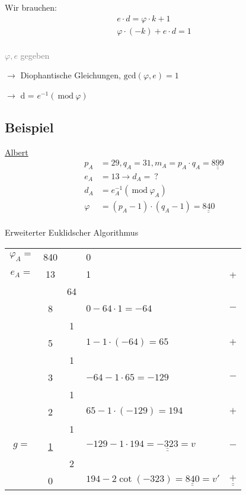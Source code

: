 \documentclass[a4paper, ngerman, landscape, fleqn]{article}
\newcommand{\Mod}{\ \mathrm{mod}\ }
\begin{document}
\begin{multicols*}{3}
Wir brauchen:
\begin{align*}
    e \cdot d = \varphi \cdot k + 1 \\
    \varphi \cdot (-k) + e \cdot d = 1 \\
\end{align*}

\textcolor{gray}{$\varphi, e$ gegeben}

$\rightarrow$ Diophantische Gleichungen, $\mathrm{gcd}(\varphi, e) = 1$

$\rightarrow$ d = $e^{-1} (\Mod \varphi)$

\subsection*{Beispiel}
\underline{Albert}
\begin{align*}
    p_A &= 29, q_A = 31, m_A = p_A \cdot q_A = \underline{\underline{899}} \\
    e_A &= 13 \rightarrow d_A =\ ? \\
    d_A &= e^{-1}_A (\Mod \varphi_A) \\
    \varphi &= (p_A - 1) \cdot (q_A - 1) = \underline{\underline{840}} \\
\end{align*}

Erweiterter Euklidscher Algorithmus

\begin{tabularx}{\linewidth}{cccYc}
    $\varphi_A =$ & 840 &    & 0 &   \\
    $e_A =$       &  13 &    & 1 & + \\
                  &     & 64 &   &   \\
                  &   8 &    & $0 -64 \cdot 1 = -64$ & $-$  \\
                  &     &  1 &   &   \\
                  &   5 &    & $1 - 1 \cdot (-64) = 65$ & $+$ \\
                  &     &  1 &   &   \\
                  &   3 &    & $-64 - 1\cdot 65 = -129$ & $-$ \\
                  &     &  1 &   &   \\
                  &   2 &    & $65 - 1 \cdot (-129) = 194$ & $+$ \\
                  &     &  1 &   &   \\
             $g=$ &   \underline{\underline{1}} &    & $-129 -1 \cdot 194 = \underline{\underline{-323}} = v$ & $-$ \\
                  &     &  2 &   &   \\
                  &   0 &    & $194 - 2\cot (-323) = \underline{\underline{840}} = v'$ & $\underline{\underline{+}}$ \\
\end{tabularx}


\end{multicols*}
\end{document}
